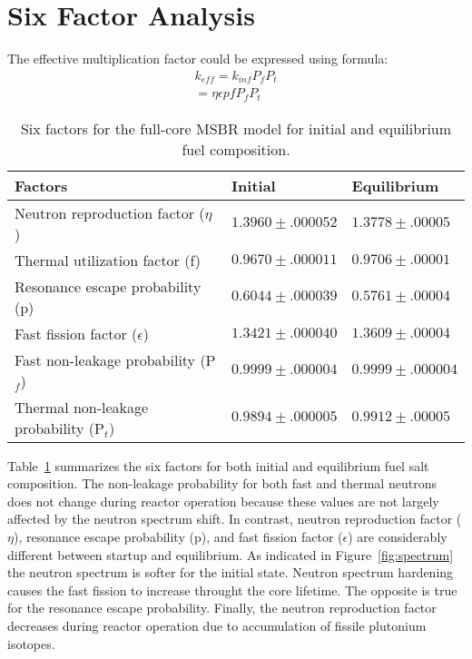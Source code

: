 \section{Six Factor Analysis}
The effective multiplication factor could be expressed using formula:
\begin{align*}
k_{eff} = k_{inf} P_f  P_t \\
 = \eta \epsilon p f P_f P_t
\end{align*}

\begin{table}[ht!]
  \centering
  \caption{Six factors for the full-core \gls{MSBR} model for initial and equilibrium fuel composition.}
\begin{tabular}{| m{} | m{} | m{} |} \hline
	   \qquad\qquad\qquad Factors  & \qquad Initial      & \qquad Equilibrium   \\ [3pt]\hline   
Neutron reproduction factor ($\eta$)     & $1.3960\pm.000052$     & $1.3778\pm.00005$ \\ [3pt] \hline
Thermal utilization factor (f)           & $0.9670\pm.000011$     & $0.9706\pm.00001$ \\ [3pt] \hline
Resonance escape probability (p)         & $0.6044\pm.000039$     & $0.5761\pm.00004$ \\ [3pt] \hline
Fast fission factor ($\epsilon$)         & $1.3421\pm.000040$     & $1.3609\pm.00004$ \\ [3pt] \hline
Fast non-leakage probability (P$_f$)     & $0.9999\pm.000004$     & $0.9999\pm.000004$ \\ [3pt] \hline
Thermal non-leakage probability (P$_t$)  & $0.9894\pm.000005$     & $0.9912\pm.00005$ \\ [3pt] \hline
\end{tabular}
  \label{tab:six_factor}
\end{table}

Table~\ref{tab:six_factor} summarizes the six factors for both initial and equilibrium fuel salt composition. The non-leakage probability for both fast and thermal neutrons does not change during reactor operation because these values are not largely affected by the neutron spectrum shift. In contrast, neutron reproduction factor ($\eta$), resonance escape probability (p), and fast fission factor ($\epsilon$) are considerably different between startup and equilibrium. As indicated in Figure~\ref{fig:spectrum} the neutron spectrum is softer for the initial state. Neutron spectrum hardening causes the fast fission to increase throught the core lifetime. The opposite is true for the resonance escape probability. Finally, the neutron reproduction factor decreases during reactor operation due to accumulation of fissile plutonium isotopes.

